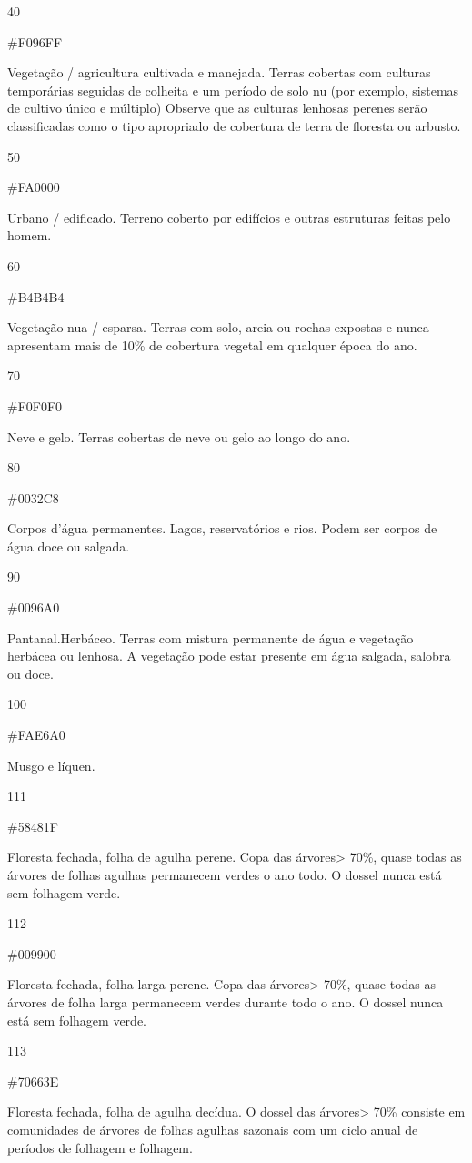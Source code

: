 \documentclass[
]{krantz}
\begin{document}
40

\#F096FF

Vegetação / agricultura cultivada e manejada. Terras cobertas com culturas temporárias seguidas de colheita e um período de solo nu (por exemplo, sistemas de cultivo único e múltiplo) Observe que as culturas lenhosas perenes serão classificadas como o tipo apropriado de cobertura de terra de floresta ou arbusto.

50

\#FA0000

Urbano / edificado. Terreno coberto por edifícios e outras estruturas feitas pelo homem.

60

\#B4B4B4

Vegetação nua / esparsa. Terras com solo, areia ou rochas expostas e nunca apresentam mais de 10\% de cobertura vegetal em qualquer época do ano.

70

\#F0F0F0

Neve e gelo. Terras cobertas de neve ou gelo ao longo do ano.

80

\#0032C8

Corpos d'água permanentes. Lagos, reservatórios e rios. Podem ser corpos de água doce ou salgada.

90

\#0096A0

Pantanal.Herbáceo. Terras com mistura permanente de água e vegetação herbácea ou lenhosa. A vegetação pode estar presente em água salgada, salobra ou doce.

100

\#FAE6A0

Musgo e líquen.

111

\#58481F

Floresta fechada, folha de agulha perene. Copa das árvores\textgreater{} 70\%, quase todas as árvores de folhas agulhas permanecem verdes o ano todo. O dossel nunca está sem folhagem verde.

112

\#009900

Floresta fechada, folha larga perene. Copa das árvores\textgreater{} 70\%, quase todas as árvores de folha larga permanecem verdes durante todo o ano. O dossel nunca está sem folhagem verde.

113

\#70663E

Floresta fechada, folha de agulha decídua. O dossel das árvores\textgreater{} 70\% consiste em comunidades de árvores de folhas agulhas sazonais com um ciclo anual de períodos de folhagem e folhagem.
\end{document}
